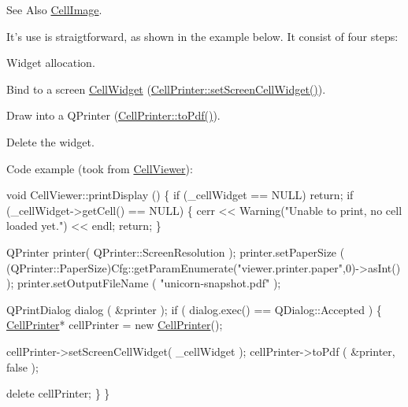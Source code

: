 \begin{DoxySeeAlso}{See Also}
\hyperlink{classHurricane_1_1CellImage}{Cell\-Image}.
\end{DoxySeeAlso}
It's use is straigtforward, as shown in the example below. It consist of four steps\-: 
\begin{DoxyEnumerate}
\item Widget allocation. 
\item Bind to a screen \hyperlink{classHurricane_1_1CellWidget}{Cell\-Widget} (\hyperlink{classHurricane_1_1CellPrinter_a7d5c8c373bf63a6f80ad5df0fbd5a702}{Cell\-Printer\-::set\-Screen\-Cell\-Widget()}). 
\item Draw into a Q\-Printer (\hyperlink{classHurricane_1_1CellPrinter_ac595a0549c1086ab92a3bc56609246ac}{Cell\-Printer\-::to\-Pdf()}). 
\item Delete the widget. 
\end{DoxyEnumerate}

Code example (took from \hyperlink{classHurricane_1_1CellViewer}{Cell\-Viewer})\-: 
\begin{DoxyCode}
\textcolor{keywordtype}{void}  CellViewer::printDisplay ()
\{
  \textcolor{keywordflow}{if} (\_cellWidget == NULL) \textcolor{keywordflow}{return};
  \textcolor{keywordflow}{if} (\_cellWidget->getCell() == NULL) \{
    cerr << Warning(\textcolor{stringliteral}{"Unable to print, no cell loaded yet."}) << endl;
    \textcolor{keywordflow}{return};
  \}

  QPrinter printer( QPrinter::ScreenResolution );
  printer.setPaperSize
    ( (QPrinter::PaperSize)Cfg::getParamEnumerate(\textcolor{stringliteral}{"viewer.printer.paper"},0)->asInt() );
  printer.setOutputFileName ( \textcolor{stringliteral}{"unicorn-snapshot.pdf"} );

  QPrintDialog  dialog ( &printer );
  \textcolor{keywordflow}{if} ( dialog.exec() == QDialog::Accepted ) \{
    \hyperlink{classHurricane_1_1CellPrinter_a9f0d00e4832cdecb1bd4bf494b4072db}{CellPrinter}* cellPrinter = \textcolor{keyword}{new} \hyperlink{classHurricane_1_1CellPrinter_a9f0d00e4832cdecb1bd4bf494b4072db}{CellPrinter}();

    cellPrinter->setScreenCellWidget( \_cellWidget );
    cellPrinter->toPdf              ( &printer, \textcolor{keyword}{false} );

    \textcolor{keyword}{delete} cellPrinter;
  \}
\}
\end{DoxyCode}


